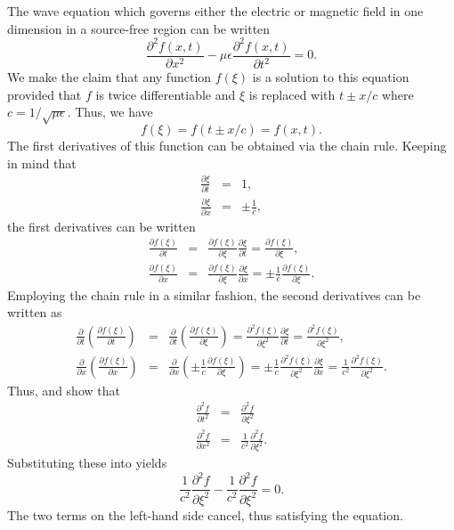 
The wave equation which governs either the electric or magnetic field
in one dimension in a source-free region can be written
\begin{equation}
  \frac{\partial^2 f(x,t)}{\partial x^2} 
  - \mu\epsilon\frac{\partial^2 f(x,t)}{\partial t^2} = 0.
  \label{eq:waveEqOne}
\end{equation}
We make the claim that any function $f(\xi)$ is a solution to this
equation provided that $f$ is twice differentiable and $\xi$ is
replaced with $t\pm x/c$ where $c=1/\sqrt{\mu\epsilon}$.  Thus, we
have
\begin{equation}
  f(\xi) = f(t\pm x/c) = f(x,t).
\end{equation}
The first derivatives of this function can be obtained via the chain
rule.  Keeping in mind that
\begin{eqnarray}
  \frac{\partial\xi}{\partial t} &=& 1,\\
  \frac{\partial\xi}{\partial x} &=& \pm\frac{1}{c},
\end{eqnarray}
the first derivatives can be written
\begin{eqnarray}
  \frac{\partial f(\xi)}{\partial t} \!&=&\!
    \frac{\partial f(\xi)}{\partial \xi} \frac{\partial \xi}{\partial t}
    = \frac{\partial f(\xi)}{\partial \xi}, \\
  \frac{\partial f(\xi)}{\partial x} \!&=&\!
    \frac{\partial f(\xi)}{\partial \xi} \frac{\partial \xi}{\partial x}
    = \pm\frac{1}{c} \frac{\partial f(\xi)}{\partial \xi}.
\end{eqnarray}
Employing the chain rule in a similar fashion, the second derivatives can
be written as
\begin{eqnarray}
  \frac{\partial}{\partial t} 
    \left(\frac{\partial f(\xi)}{\partial t}\right) \!&=&\!
    \frac{\partial}{\partial t} 
    \left(\frac{\partial f(\xi)}{\partial \xi}\right) =
    \frac{\partial^2 f(\xi)}{\partial \xi^2}\frac{\partial \xi}{\partial t} =
    \frac{\partial^2 f(\xi)}{\partial \xi^2}, \label{eq:waveProof}\\
  \frac{\partial}{\partial x} 
    \left(\frac{\partial f(\xi)}{\partial x}\right) \!&=&\!
    \frac{\partial}{\partial x} 
    \left(\pm\frac{1}{c} \frac{\partial f(\xi)}{\partial \xi}\right)
    = \pm\frac{1}{c} \frac{\partial^2 f(\xi)}{\partial \xi^2}
                      \frac{\partial\xi}{\partial x} 
    = \frac{1}{c^2} \frac{\partial^2 f(\xi)}{\partial \xi^2}.
   \label{eq:waveProofI}
\end{eqnarray}
Thus,  and  show that
\begin{eqnarray}
  \frac{\partial^2 f}{\partial t^2} &=&
     \frac{\partial^2 f}{\partial \xi^2}\\
  \frac{\partial^2 f}{\partial x^2} &=&
     \frac{1}{c^2} \frac{\partial^2 f}{\partial \xi^2}.
\end{eqnarray}
Substituting these into  yields
\begin{equation}
  \frac{1}{c^2} \frac{\partial^2 f}{\partial \xi^2} 
  - \frac{1}{c^2} \frac{\partial^2 f}{\partial \xi^2} = 0.
\end{equation}
The two terms on the left-hand side cancel, thus satisfying the
equation.

